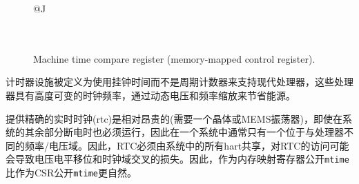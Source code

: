 {\begin{figure}[h!]
	{\footnotesize
		\begin{center}
			\begin{tabular}{@{}J}
				 \\
				\hline
				 \\
				 \\
			\end{tabular}
		\end{center}
	}
	\vspace{-0.1in}
	\caption{Machine time compare register (memory-mapped control register).}
\end{figure}

\iffalse
\begin{commentary}
	The timer facility is defined to use wall-clock time rather than a
	cycle counter to support modern processors that run with a highly
	variable clock frequency to save energy through dynamic voltage and
	frequency scaling.

	Accurate real-time clocks (RTCs) are relatively expensive to provide
	(requiring a crystal or MEMS oscillator) and have to run even when the
	rest of system is powered down, and so there is usually only one in a
	system located in a different frequency/voltage domain from the
	processors.  Hence, the RTC must be shared by all the harts in a
	system and accesses to the RTC will potentially incur the penalty of a
	voltage-level-shifter and clock-domain crossing.  It is thus more
	natural to expose {\tt mtime} as a memory-mapped register than as a CSR.

	Lower privilege levels do not have their own {\tt timecmp} registers.
	Instead, machine-mode software can implement any number of virtual timers on
	a hart by multiplexing the next timer interrupt into the {\tt mtimecmp}
	register.

	Simple fixed-frequency systems can use a single clock for both cycle
	counting and wall-clock time.
\end{commentary}
\fi
计时器设施被定义为使用挂钟时间而不是周期计数器来支持现代处理器，这些处理器具有高度可变的时钟频率，通过动态电压和频率缩放来节省能源。

提供精确的实时时钟(rtc)是相对昂贵的(需要一个晶体或MEMS振荡器)，即使在系统的其余部分断电时也必须运行，因此在一个系统中通常只有一个位于与处理器不同的频率/电压域。因此，RTC必须由系统中的所有hart共享，对RTC的访问可能会导致电压电平移位和时钟域交叉的损失。因此，作为内存映射寄存器公开{\tt mtime}比作为CSR公开{\tt mtime}更自然。

}
